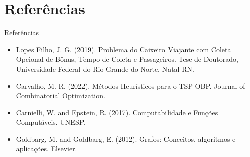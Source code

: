 \documentclass[aspectratio=169,xcolor=table]{beamer}
\begin{document}
\section{Referências}

\begin{frame}{Referências}
    \begin{itemize}
        \item Lopes Filho, J. G. (2019). Problema do Caixeiro Viajante com Coleta Opcional de Bônus, Tempo de Coleta e Passageiros. Tese de Doutorado, Universidade Federal do Rio Grande do Norte, Natal-RN.
        
        \item Carvalho, M. R. (2022). Métodos Heurísticos para o TSP-OBP. Journal of Combinatorial Optimization.
        
        \item Carnielli, W. and Epstein, R. (2017). Computabilidade e Funções Computáveis. UNESP.
        
        \item Goldbarg, M. and Goldbarg, E. (2012). Grafos: Conceitos, algoritmos e aplicações. Elsevier.
    \end{itemize}
\end{frame}
\end{document}

